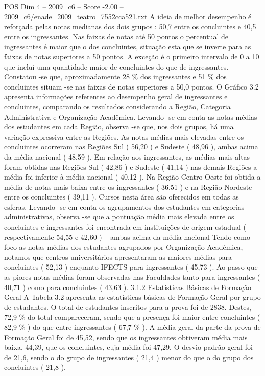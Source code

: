 \begin{textsample}{POS Dim 4 – 2009\_c6 – Score -2.00 – 2009\_c6/enade\_2009\_teatro\_7552cca521.txt}
A ideia de melhor desempenho é reforçada pelas notas medianas dos dois grupos : 50,7 entre os concluintes e 40,5 entre os ingressantes.
Nas faixas de notas até 50 pontos o percentual de ingressantes é maior que o dos concluintes, situação esta que se inverte para as faixas de notas superiores a 50 pontos.
A exceção é o primeiro intervalo de 0 a 10 que inclui uma quantidade maior de concluintes do que de ingressantes.
Constatou -se que, aproximadamente 28 \% dos ingressantes e 51 \% dos concluintes situam -se nas faixas de notas superiores a 50,0 pontos.
O Gráfico 3.2 apresenta informações referentes ao desempenho geral de ingressantes e concluintes, comparando os resultados considerando a Região, Categoria Administrativa e Organização Acadêmica.
Levando -se em conta as notas médias dos estudantes em cada Região, observa -se que, nos dois grupos, há uma variação expressiva entre as Regiões.
As notas médias mais elevadas entre os concluintes ocorreram nas Regiões Sul ( 56,20 ) e Sudeste ( 48,96 ), ambas acima da média nacional ( 48,59 ).
Em relação aos ingressantes, as médias mais altas foram obtidas nas Regiões Sul ( 42,86 ) e Sudeste ( 41,14 ) nas demais Regiões a média foi inferior à média nacional ( 40,12 ).
Na Região Centro-Oeste foi obtida a média de notas mais baixa entre os ingressantes ( 36,51 ) e na Região Nordeste entre os concluintes ( 39,11 ).
Cursos nesta área são oferecidos em todas as esferas.
Levando -se em conta os agrupamentos dos estudantes em categorias administrativas, observa -se que a pontuação média mais elevada entre os concluintes e ingressantes foi encontrada em instituições de origem estadual ( respectivamente 54,55 e 42,60 ) – ambas acima da média nacional Tendo como foco as notas médias dos estudantes agrupados por Organização Acadêmica, notamos que centros universitários apresentaram as maiores médias para concluintes ( 52,13 ) enquanto IFECTS para ingressantes ( 45,73 ).
Ao passo que as piores notas médias foram observadas nas Faculdades tanto para ingressantes ( 40,71 ) como para concluintes ( 43,63 ). 3.1.2 Estatísticas Básicas de Formação Geral A Tabela 3.2 apresenta as estatísticas básicas de Formação Geral por grupo de estudantes.
O total de estudantes inscritos para a prova foi de 2838.
Destes, 72,9 \% do total compareceram, sendo que a presença foi maior entre concluintes ( 82,9 \% ) do que entre ingressantes ( 67,7 \% ).
A média geral da parte da prova de Formação Geral foi de 45,52, sendo que os ingressantes obtiveram média mais baixa, 44,39, que os concluintes, cuja média foi 47,29.
O desvio-padrão geral foi de 21,6, sendo o do grupo de ingressantes ( 21,4 ) menor do que o do grupo dos concluintes ( 21,8 ).

\end{textsample}
